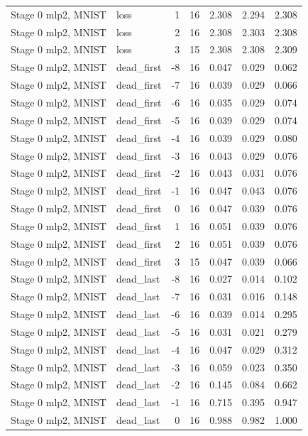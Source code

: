 \begin{table}[htbp]
{\begin{tabular}{@{}llrrrrr@{}}
Stage 0 mlp2, MNIST & loss & 1 & 16 & 2.308 & 2.294 & 2.308 \\
Stage 0 mlp2, MNIST & loss & 2 & 16 & 2.308 & 2.303 & 2.308 \\
Stage 0 mlp2, MNIST & loss & 3 & 15 & 2.308 & 2.308 & 2.309 \\
Stage 0 mlp2, MNIST & dead\_first & -8 & 16 & 0.047 & 0.029 & 0.062 \\
Stage 0 mlp2, MNIST & dead\_first & -7 & 16 & 0.039 & 0.029 & 0.066 \\
Stage 0 mlp2, MNIST & dead\_first & -6 & 16 & 0.035 & 0.029 & 0.074 \\
Stage 0 mlp2, MNIST & dead\_first & -5 & 16 & 0.039 & 0.029 & 0.074 \\
Stage 0 mlp2, MNIST & dead\_first & -4 & 16 & 0.039 & 0.029 & 0.080 \\
Stage 0 mlp2, MNIST & dead\_first & -3 & 16 & 0.043 & 0.029 & 0.076 \\
Stage 0 mlp2, MNIST & dead\_first & -2 & 16 & 0.043 & 0.031 & 0.076 \\
Stage 0 mlp2, MNIST & dead\_first & -1 & 16 & 0.047 & 0.043 & 0.076 \\
Stage 0 mlp2, MNIST & dead\_first & 0 & 16 & 0.047 & 0.039 & 0.076 \\
Stage 0 mlp2, MNIST & dead\_first & 1 & 16 & 0.051 & 0.039 & 0.076 \\
Stage 0 mlp2, MNIST & dead\_first & 2 & 16 & 0.051 & 0.039 & 0.076 \\
Stage 0 mlp2, MNIST & dead\_first & 3 & 15 & 0.047 & 0.039 & 0.066 \\
Stage 0 mlp2, MNIST & dead\_last & -8 & 16 & 0.027 & 0.014 & 0.102 \\
Stage 0 mlp2, MNIST & dead\_last & -7 & 16 & 0.031 & 0.016 & 0.148 \\
Stage 0 mlp2, MNIST & dead\_last & -6 & 16 & 0.039 & 0.014 & 0.295 \\
Stage 0 mlp2, MNIST & dead\_last & -5 & 16 & 0.031 & 0.021 & 0.279 \\
Stage 0 mlp2, MNIST & dead\_last & -4 & 16 & 0.047 & 0.029 & 0.312 \\
Stage 0 mlp2, MNIST & dead\_last & -3 & 16 & 0.059 & 0.023 & 0.350 \\
Stage 0 mlp2, MNIST & dead\_last & -2 & 16 & 0.145 & 0.084 & 0.662 \\
Stage 0 mlp2, MNIST & dead\_last & -1 & 16 & 0.715 & 0.395 & 0.947 \\
Stage 0 mlp2, MNIST & dead\_last & 0 & 16 & 0.988 & 0.982 & 1.000 \\

\end{tabular}}
\end{table}
